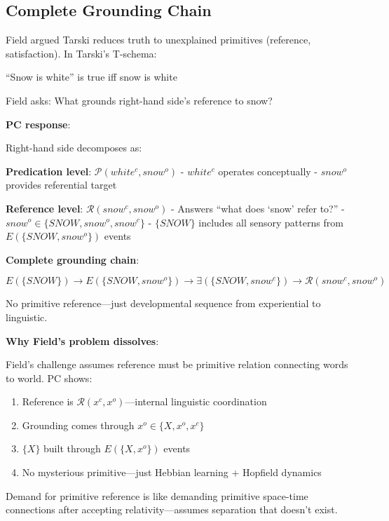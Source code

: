 \documentclass[12pt]{article}
\providecommand{\tightlist}{}   %
\begin{document}
\subsection{Complete Grounding Chain}\label{complete-grounding-chain}

Field argued Tarski reduces truth to unexplained primitives (reference, satisfaction). In Tarski's T-schema:

``Snow is white'' is true iff snow is white

Field asks: What grounds right-hand side's reference to snow?

\textbf{PC response}:

Right-hand side decomposes as:

\textbf{Predication level}: \(\mathcal{P}(white^c, snow^o)\) - \(white^c\) operates conceptually - \(snow^o\) provides referential target

\textbf{Reference level}: \(\mathcal{R}(snow^c, snow^o)\) - Answers ``what does `snow' refer to?'' - \(snow^o \in \{SNOW, snow^o, snow^c\}\) - \(\{SNOW\}\) includes all sensory patterns from \(E(\{SNOW, snow^o\})\) events

\textbf{Complete grounding chain}:

\[E(\{SNOW\}) \rightarrow E(\{SNOW, snow^o\}) \rightarrow \exists(\{SNOW, snow^c\}) \rightarrow \mathcal{R}(snow^c, snow^o)\]

No primitive reference---just developmental sequence from experiential to linguistic.

\textbf{Why Field's problem dissolves}:

Field's challenge assumes reference must be primitive relation connecting words to world. PC shows:

\begin{enumerate}
\def\labelenumi{\arabic{enumi}.}
\tightlist
\item
  Reference is \(\mathcal{R}(x^c, x^o)\)---internal linguistic coordination
\item
  Grounding comes through \(x^o \in \{X, x^o, x^c\}\)
\item
  \(\{X\}\) built through \(E(\{X, x^o\})\) events
\item
  No mysterious primitive---just Hebbian learning + Hopfield dynamics
\end{enumerate}

Demand for primitive reference is like demanding primitive space-time connections after accepting relativity---assumes separation that doesn't exist.
\end{document}
